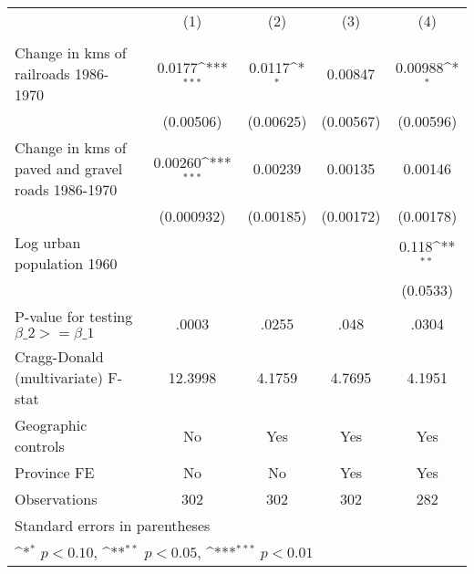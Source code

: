 {
\def\sym#1{\ifmmode^{#1}\else\(^{#1}\)\fi}
\begin{tabular}{l*{4}{c}}
\hline\hline
                &\multicolumn{1}{c}{(1)}&\multicolumn{1}{c}{(2)}&\multicolumn{1}{c}{(3)}&\multicolumn{1}{c}{(4)}\\
                &\multicolumn{1}{c}{}&\multicolumn{1}{c}{}&\multicolumn{1}{c}{}&\multicolumn{1}{c}{}\\
\hline
Change in kms of railroads 1986-1970&   0.0177\sym{***}&   0.0117\sym{*}  &  0.00847         &  0.00988\sym{*}  \\
                &(0.00506)         &(0.00625)         &(0.00567)         &(0.00596)         \\
[1em]
Change in kms of paved and gravel roads 1986-1970&  0.00260\sym{***}&  0.00239         &  0.00135         &  0.00146         \\
                &(0.000932)         &(0.00185)         &(0.00172)         &(0.00178)         \\
[1em]
Log urban population 1960&                  &                  &                  &    0.118\sym{**} \\
                &                  &                  &                  & (0.0533)         \\
\hline
P-value for testing $\beta\_{2} >= \beta\_{1}$&    .0003         &    .0255         &     .048         &    .0304         \\
Cragg-Donald (multivariate) F-stat&  12.3998         &   4.1759         &   4.7695         &   4.1951         \\
Geographic controls&       No         &      Yes         &      Yes         &      Yes         \\
Province FE     &       No         &       No         &      Yes         &      Yes         \\
Observations    &      302         &      302         &      302         &      282         \\
\hline\hline
\multicolumn{5}{l}{\footnotesize Standard errors in parentheses}\\
\multicolumn{5}{l}{\footnotesize \sym{*} \(p<0.10\), \sym{**} \(p<0.05\), \sym{***} \(p<0.01\)}\\
\end{tabular}
}
